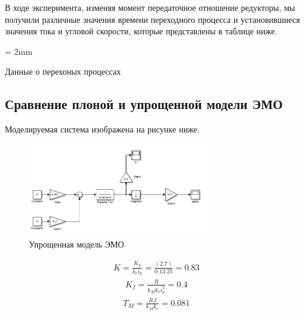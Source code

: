 \documentclass[a4paper, 12pt]{article}
\begin{document}
В ходе эксперимента, изменяя момент передаточное отношение редукторы, мы получили различные значения времени переходного процесса и установившиеся значения тока и угловой скорости, которые представлены в таблице ниже.
\newpage
\begin{table}[h!]
   \tabulinesep = 2mm
   \centering
   \begin{threeparttable}
        \caption{Данные о перехоных процессах }
            \end{threeparttable}          
\end{table}

\newpage
\begin{center}
\section{Сравнение плоной и упрощенной модели ЭМО}
\end{center}
\par Моделируемая система изображена на рисунке ниже.

\begin{figure}[h!]
    \centering
    \includegraphics[width = 0.7\textwidth]{images/EasyModel/2.png}
    \caption{Упрощенная модель ЭМО}
\end{figure}
\begin{align}
K = \frac{K_y}{k_e i_p}=\frac{(2.7)}{0.13.25}=0.83
\end{align}
\begin{align}
K_f = \frac{R}{k_M k_e i_p^2}=0.4
\end{align}
\begin{align}
T_M = \frac{RJ}{k_M k_e}=0.081
\end{align}
\newpage
\end{document}
